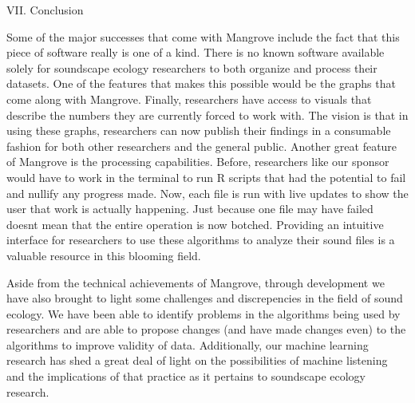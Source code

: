 \begin{center}
VII. Conclusion
\end{center}
\begin{flushleft}
\setlength{\parindent}{0.125in}
Some of the major successes that come with Mangrove include the fact that this piece of software really is one of a kind. There is no known software available solely for soundscape ecology researchers to both organize and process their datasets. One of the features that makes this possible would be the graphs that come along with Mangrove. Finally, researchers have access to visuals that describe the numbers they are currently forced to work with. The vision is that in using these graphs, researchers can now publish their findings in a consumable fashion for both other researchers and the general public. Another great feature of Mangrove is the processing capabilities. Before, researchers like our sponsor would have to work in the terminal to run R scripts that had the potential to fail and nullify any progress made. Now, each file is run with live updates to show the user that work is actually happening. Just because one file may have failed doesn\textquotesingle t mean that the entire operation is now botched. Providing an intuitive interface for researchers to use these algorithms to analyze their sound files is a valuable resource in this blooming field.\par
Aside from the technical achievements of Mangrove, through development we have also brought to light some challenges and discrepencies in the field of sound ecology. We have been able to identify problems in the algorithms being used by researchers and are able to propose changes (and have made changes even) to the algorithms to improve validity of data. Additionally, our machine learning research has shed a great deal of light on the possibilities of machine listening and the implications of that practice as it pertains to soundscape ecology research.\par
\end{flushleft}

